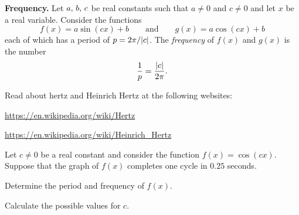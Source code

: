 \documentclass[a4paper,oneside,12pt]{article}
\begin{document}
\begin{definition}
\label{def:trigonometric:sine_cosine_frequency}
\textbf{Frequency.}
Let ${a},\, {b},\, {c}$ be real constants such that $a \neq 0$ and
$c \neq 0$ and let $x$ be a real variable.  Consider the functions
\[
f(x)
=
a \sin(cx) + b
\qquad
\text{and}
\qquad
g(x)
=
a \cos(cx) + b
\]
each of which has a period of $p = 2 \pi / \lvert c\rvert$.  The
\emph{frequency} of $f(x)$ and $g(x)$ is the number
\begin{equation}
\label{eqn:trigonometric:frequency_sin_cos}
\frac{1}{p}
=
\frac{\lvert c\rvert}{2\pi}.
\end{equation}
\end{definition}

\begin{exercise}
Read about hertz and Heinrich Hertz at the following websites:
\begin{packeditem}
\item \url{https://en.wikipedia.org/wiki/Hertz}

\item \url{https://en.wikipedia.org/wiki/Heinrich_Hertz}
\end{packeditem}
\end{exercise}

\begin{example}
Let $c \neq 0$ be a real constant and consider the function
$f(x) = \cos(cx)$.  Suppose that the graph of $f(x)$ completes one
cycle in $0.25$ seconds.
\begin{packedenum}
\item\label{subeg:trigonometric:cos_1_cycle_0.25_seconds_period}
  Determine the period and frequency of $f(x)$.

\item\label{subeg:trigonometric:cos_1_cycle_0.25_seconds_c_factor}
  Calculate the possible values for $c$.
\end{packedenum}
\end{example}
\end{document}
